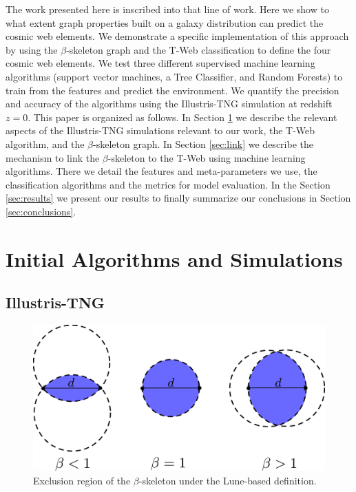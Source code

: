 \documentclass[usenatbib]{mnras}
\begin{document}
The work presented here is inscribed into that line of work.
Here we show to what extent graph properties built on a galaxy
distribution can predict the cosmic web elements.
We demonstrate a specific implementation of this approach by using
the $\beta$-skeleton graph \citep{Fang2019} and the  T-Web
\citep{Forero-Romero2009} classification to define the four cosmic web
elements.  
We test three different supervised machine learning
algorithms (support vector machines, a Tree Classifier, and Random Forests) 
to train from the features and predict the environment.
We quantify the precision and accuracy of the algorithms using the
Illustris-TNG simulation \citep{Nelson2015} at redshift $z=0$. 
This paper is organized as follows. 
In Section \ref{sec:init} we describe the relevant aspects of the Illustris-TNG
simulations relevant to our work, the T-Web algorithm,
and the $\beta$-skeleton graph.
In Section \ref{sec:link} we describe the mechanism to link the
$\beta$-skeleton to the T-Web using machine learning algorithms.
There we detail the features and meta-parameters we use, the
classification algorithms and the metrics for model evaluation.  
In the Section \ref{sec:results} we present our results
to finally summarize our conclusions in Section
\ref{sec:conclusions}.


\section{Initial Algorithms and Simulations}\label{sec:init}

\subsection{Illustris-TNG}


\begin{figure}
\centering
 \includegraphics[scale=0.18]{Figs/p_beta.pdf}
 \caption{Exclusion region of the $\beta$-skeleton under the Lune-based definition. }  
 \label{fig:beta}
\end{figure}
\end{document}
